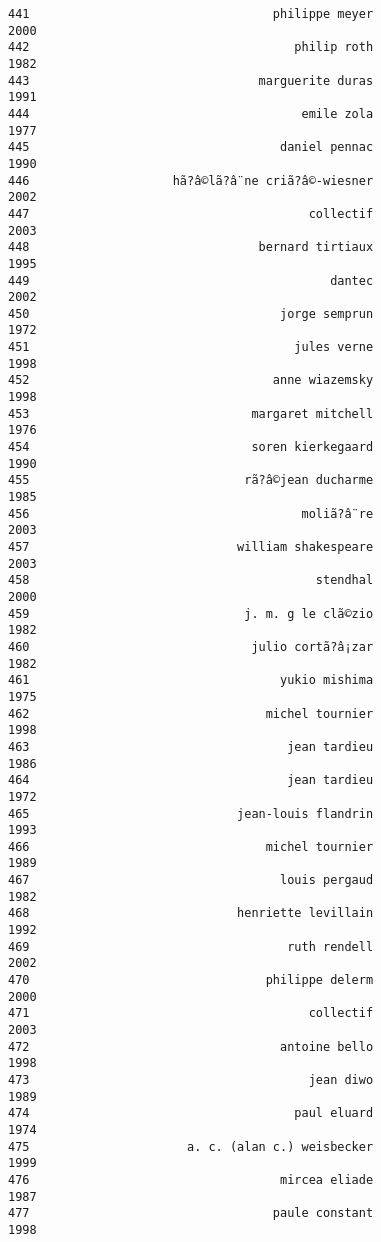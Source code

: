 \documentclass[
]{report}
\begin{document}
\begin{verbatim}
441                                  philippe meyer                2000
442                                     philip roth                1982
443                                marguerite duras                1991
444                                      emile zola                1977
445                                   daniel pennac                1990
446                    hã?â©lã?â¨ne criã?â©-wiesner                2002
447                                       collectif                2003
448                                bernard tirtiaux                1995
449                                          dantec                2002
450                                   jorge semprun                1972
451                                     jules verne                1998
452                                  anne wiazemsky                1998
453                               margaret mitchell                1976
454                               soren kierkegaard                1990
455                              rã?â©jean ducharme                1985
456                                      moliã?â¨re                2003
457                             william shakespeare                2003
458                                        stendhal                2000
459                              j. m. g le clã©zio                1982
460                               julio cortã?â¡zar                1982
461                                   yukio mishima                1975
462                                 michel tournier                1998
463                                    jean tardieu                1986
464                                    jean tardieu                1972
465                             jean-louis flandrin                1993
466                                 michel tournier                1989
467                                   louis pergaud                1982
468                             henriette levillain                1992
469                                    ruth rendell                2002
470                                 philippe delerm                2000
471                                       collectif                2003
472                                   antoine bello                1998
473                                       jean diwo                1989
474                                     paul eluard                1974
475                      a. c. (alan c.) weisbecker                1999
476                                   mircea eliade                1987
477                                  paule constant                1998

\end{verbatim}
\end{document}
